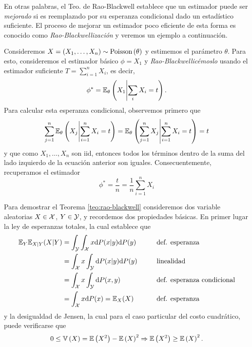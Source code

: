 En otras palabras, el Teo. de Rao-Blackwell establece que un estimador puede ser \textit{mejorado} si es reemplazado por su esperanza condicional dado un estadístico suficiente. El proceso de mejorar un estimador poco eficiente de esta forma es conocido como \textit{Rao-Blackwellización} y veremos un ejemplo a continuación.


\begin{example}
Consideremos $X = (X_1,\ldots,X_n)\sim \text{Poisson}\left(\theta\right)$ y estimemos el parámetro $\theta$. Para esto, consideremos el estimador básico $\phi = X_1$ y \textit{Rao-Blackwellicémoslo} usando el estimador suficiente $T=\sum_{i=1}^nX_i$, es decir, 
\begin{equation}
	\phi^* = \mathbb{E}_\theta \left(X_1\middle|\sum_i X_i=t\right).
\end{equation}
Para calcular esta esperanza condicional, observemos primero que  
\begin{equation}
	\sum_{j=1}^n\mathbb{E}_\theta \left(X_j\middle|\sum_{i=1}^n X_i=t\right) = \mathbb{E}_\theta \left(\sum_{j=1}^nX_j\middle|\sum_{i=1}^n X_i=t\right) = t
\end{equation}
y que como $X_1,\ldots,X_n$ son iid, entonces todos los términos dentro de la suma del lado izquierdo de la ecuación anterior son iguales. Consecuentemente, recuperamos el estimador
\begin{equation}
 	\phi^* = \frac{t}{n} = \frac{1}{n}\sum_{i=1}^nX_i
 \end{equation} 
\end{example}

Para demostrar el Teorema \ref{teo:rao-blackwell} consideremos dos variable aleatorias $X\in{\mathcal X}$, $Y\in{\mathcal Y}$, y recordemos dos propiedades básicas. En primer lugar la ley de esperanzas totales, la cual establece que 
\begin{alignat}{3}
	\mathbb{E}_Y{\mathbb{E}_{X|Y}{(X|Y)}} &= \int_{\mathcal Y}\int_{\mathcal X} x {\text{d}} P(x|y) {\text{d}} P(y) \quad\quad&&\text{def. esperanza}\nonumber\\
				&=  \int_{\mathcal X} x \int_{\mathcal Y} {\text{d}} P(x|y) {\text{d}} P(y) &&\text{linealidad}\nonumber\\
				&=  \int_{\mathcal X} x \int_{\mathcal Y} {\text{d}} P(x,y) &&\text{def. esperanza condicional}\nonumber\\
				&=  \int_{\mathcal X} x {\text{d}} P(x) = \mathbb{E}_X(X) &&\text{def. esperanza} \label{eq:total_expectation}
\end{alignat}
y la desigualdad de Jensen, la cual para el caso particular del costo cuadrático, puede verificarse que
\begin{equation}
	0 \leq \mathbb{V} \left(X\right) =  \mathbb{E} \left(X^2\right)-\mathbb{E} \left(X\right)^2 \Rightarrow \mathbb{E} \left(X^2\right) \geq \mathbb{E} \left(X\right)^2. \label{eq:jensen_var}
\end{equation}

